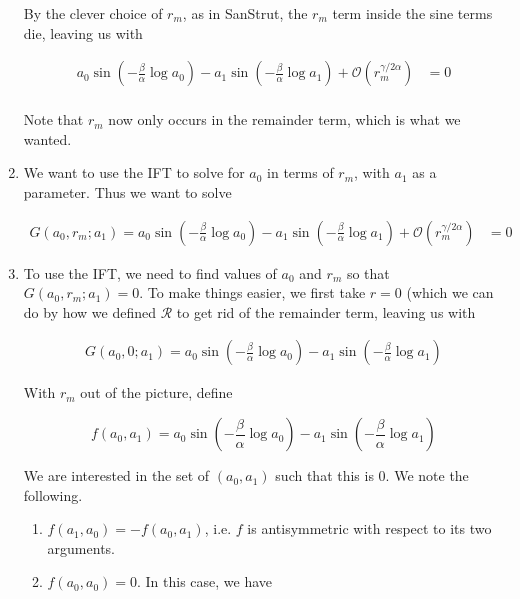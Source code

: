 \documentclass[12pt]{article}
\begin{document}
\begin{enumerate}
By the clever choice of $r_m$, as in SanStrut, the $r_m$ term inside the sine terms die, leaving us with

\begin{align}\label{jumpeq4}
a_0 \sin \left( - \frac{\beta}{\alpha} \log a_0 \right) - a_1 \sin \left( - \frac{\beta}{\alpha} \log a_1 \right) + \mathcal{O}(r_m^{\gamma / 2 \alpha}) &= 0 \\
\end{align}

Note that $r_m$ now only occurs in the remainder term, which is what we wanted.

\item We want to use the IFT to solve for $a_0$ in terms of $r_m$, with $a_1$ as a parameter. Thus we want to solve

\begin{align*}
G(a_0, r_m; a_1) = 
a_0 \sin \left( - \frac{\beta}{\alpha} \log a_0 \right) - a_1 \sin \left( - \frac{\beta}{\alpha} \log a_1 \right) + \mathcal{O}(r_m^{\gamma / 2 \alpha}) &= 0
\end{align*}

\item To use the IFT, we need to find values of $a_0$ and $r_m$ so that $G(a_0, r_m; a_1) = 0$. To make things easier, we first take $r = 0$ (which we can do by how we defined $\mathcal{R}$ to get rid of the remainder term, leaving us with

\begin{align*}
G(a_0, 0; a_1) = 
a_0 \sin \left( - \frac{\beta}{\alpha} \log a_0 \right) - a_1 \sin \left( - \frac{\beta}{\alpha} \log a_1 \right)
\end{align*}

With $r_m$ out of the picture, define

\begin{equation}
f(a_0, a_1) = 
a_0 \sin \left( - \frac{\beta}{\alpha} \log a_0 \right) - a_1 \sin \left( - \frac{\beta}{\alpha} \log a_1 \right)
\end{equation}

We are interested in the set of $(a_0, a_1)$ such that this is 0. We note the following.

\begin{enumerate}
	\item $f(a_1, a_0) = -f(a_0, a_1)$, i.e. $f$ is antisymmetric with respect to its two arguments.

	\item $f(a_0, a_0) = 0$. In this case, we have


\end{enumerate}
\end{enumerate}
\end{document}
